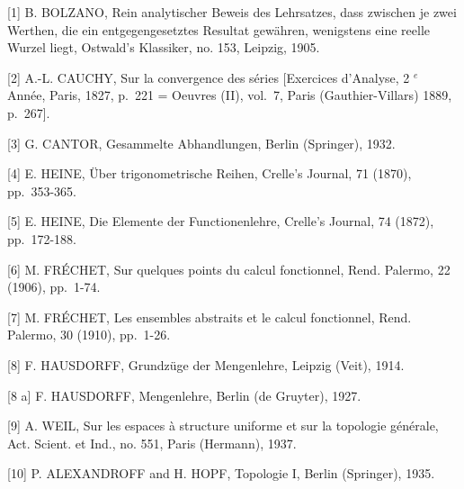 
{[}1{]} B. BOLZANO, Rein analytischer Beweis des Lehrsatzes, dass zwischen je zwei Werthen, die ein entgegengesetztes Resultat gewähren, wenigstens eine reelle Wurzel liegt, Ostwald's Klassiker, no. 153, Leipzig, 1905.

{[}2{]} A.-L. CAUCHY, Sur la convergence des séries {[}Exercices d'Analyse, 2 \(^{e}\) Année, Paris, 1827, p.~221 = Oeuvres (II), vol.~7, Paris (Gauthier-Villars) 1889, p.~267{]}.

{[}3{]} G. CANTOR, Gesammelte Abhandlungen, Berlin (Springer), 1932.

{[}4{]} E. HEINE, Über trigonometrische Reihen, Crelle's Journal, 71 (1870), pp.~353-365.

{[}5{]} E. HEINE, Die Elemente der Functionenlehre, Crelle's Journal, 74 (1872), pp.~172-188.

{[}6{]} M. FRÉCHET, Sur quelques points du calcul fonctionnel, Rend. Palermo, 22 (1906), pp.~1-74.

{[}7{]} M. FRÉCHET, Les ensembles abstraits et le calcul fonctionnel, Rend. Palermo, 30 (1910), pp.~1-26.

{[}8{]} F. HAUSDORFF, Grundzüge der Mengenlehre, Leipzig (Veit), 1914.

{[}8 a{]} F. HAUSDORFF, Mengenlehre, Berlin (de Gruyter), 1927.

{[}9{]} A. WEIL, Sur les espaces à structure uniforme et sur la topologie générale, Act. Scient. et Ind., no. 551, Paris (Hermann), 1937.

{[}10{]} P. ALEXANDROFF and H. HOPF, Topologie I, Berlin (Springer), 1935.

